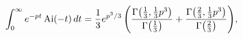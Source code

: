 \[\int_{0}^{\infty}e^{-pt}\mathop{\mathrm{Ai}\/}\nolimits\!\left(-t\right)dt={%
\frac{1}{3}e^{p^{3}/3}\left(\frac{\mathop{\Gamma\/}\nolimits\!\left(\tfrac{1}{%
3},\tfrac{1}{3}p^{3}\right)}{\mathop{\Gamma\/}\nolimits\!\left(\tfrac{1}{3}%
\right)}+\frac{\mathop{\Gamma\/}\nolimits\!\left(\tfrac{2}{3},\tfrac{1}{3}p^{3%
}\right)}{\mathop{\Gamma\/}\nolimits\!\left(\tfrac{2}{3}\right)}\right)},\]